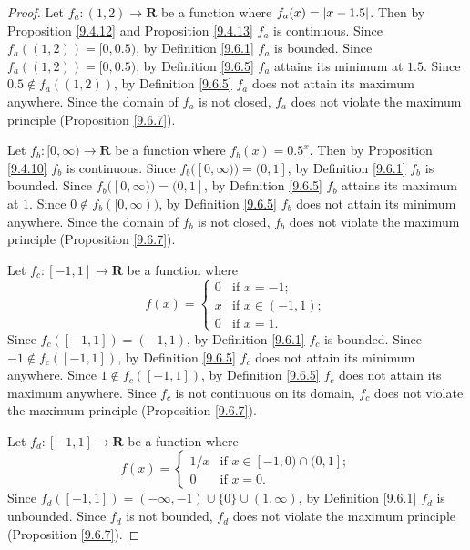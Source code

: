 \begin{proof}
    Let \(f_a : (1, 2) \to \mathbf{R}\) be a function where \(f_a(x) = \abs*{x - 1.5}\).
    Then by Proposition \ref{9.4.12} and Proposition \ref{9.4.13} \(f_a\) is continuous.
    Since \(f_a((1, 2)) = [0, 0.5)\), by Definition \ref{9.6.1} \(f_a\) is bounded.
    Since \(f_a((1, 2)) = [0, 0.5)\), by Definition \ref{9.6.5} \(f_a\) attains its minimum at \(1.5\).
    Since \(0.5 \notin f_a((1, 2))\), by Definition \ref{9.6.5} \(f_a\) does not attain its maximum anywhere.
    Since the domain of \(f_a\) is not closed, \(f_a\) does not violate the maximum principle (Proposition \ref{9.6.7}).

    Let \(f_b : [0, \infty) \to \mathbf{R}\) be a function where \(f_b(x) = 0.5^x\).
    Then by Proposition \ref{9.4.10} \(f_b\) is continuous.
    Since \(f_b([0, \infty)) = (0, 1]\), by Definition \ref{9.6.1} \(f_b\) is bounded.
    Since \(f_b([0, \infty)) = (0, 1]\), by Definition \ref{9.6.5} \(f_b\) attains its maximum at \(1\).
    Since \(0 \notin f_b([0, \infty))\), by Definition \ref{9.6.5} \(f_b\) does not attain its minimum anywhere.
    Since the domain of \(f_b\) is not closed, \(f_b\) does not violate the maximum principle (Proposition \ref{9.6.7}).

    Let \(f_c : [-1, 1] \to \mathbf{R}\) be a function where
    \[
        f(x) = \begin{cases}
            0 & \text{if } x = -1; \\
            x & \text{if } x \in (-1, 1); \\
            0 & \text{if } x = 1.
        \end{cases}
    \]
    Since \(f_c([-1, 1]) = (-1, 1)\), by Definition \ref{9.6.1} \(f_c\) is bounded.
    Since \(-1 \notin f_c([-1, 1])\), by Definition \ref{9.6.5} \(f_c\) does not attain its minimum anywhere.
    Since \(1 \notin f_c([-1, 1])\), by Definition \ref{9.6.5} \(f_c\) does not attain its maximum anywhere.
    Since \(f_c\) is not continuous on its domain, \(f_c\) does not violate the maximum principle (Proposition \ref{9.6.7}).

    Let \(f_d : [-1, 1] \to \mathbf{R}\) be a function where
    \[
        f(x) = \begin{cases}
            1 / x & \text{if } x \in [-1, 0) \cap (0, 1]; \\
            0 & \text{if } x = 0.
        \end{cases}
    \]
    Since \(f_d([-1, 1]) = (-\infty, -1) \cup \{0\} \cup (1, \infty)\), by Definition \ref{9.6.1} \(f_d\) is unbounded.
    Since \(f_d\) is not bounded, \(f_d\) does not violate the maximum principle (Proposition \ref{9.6.7}).
\end{proof}